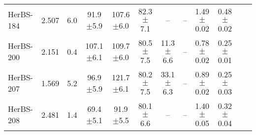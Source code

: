 \begin{landscape}
\begin{longtable}{lccccccccccr}
	HerBS-184 & 2.507 & 6.0 & 91.9$\pm$5.9 & 107.6$\pm$6.0 & 82.3$\pm$7.1 & -- & -- & 1.49$\pm$0.02 & 0.48$\pm$0.02\\
	HerBS-200 & 2.151 & 0.4 & 107.1$\pm$6.1 & 109.7$\pm$6.0 & 80.5$\pm$7.5 & 11.3$\pm$6.6 & -- & 0.78$\pm$0.02 & 0.25$\pm$0.01\\
	HerBS-207 & 1.569 & 5.2 & 96.9$\pm$5.9 & 121.7$\pm$6.1 & 80.2$\pm$7.5 & 33.1$\pm$6.3 & -- & 0.89$\pm$0.02 & 0.25$\pm$0.03\\
	HerBS-208 & 2.481 & 1.4 & 69.4$\pm$5.1 & 91.9$\pm$5.5 & 80.1$\pm$6.6 & -- & -- & 1.40$\pm$0.05 & 0.32$\pm$0.04\\
	\hline
\end{longtable}
\end{landscape}
